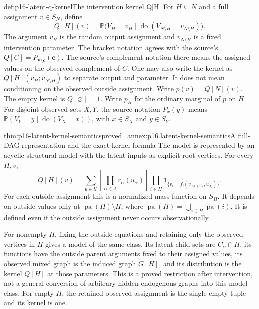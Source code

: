\begin{hbdefinition}{def:p16-latent-q-kernel}{The intervention kernel Q[H]}
For \(H\subseteq N\) and a full assignment \(v\in S_N\), define
\[
 Q[H](v)=
 \mathbb P\bigl(V_H=v_H\mid
       \operatorname{do}(V_{N\setminus H}=v_{N\setminus H})\bigr).
\]
The argument \(v_H\) is the random output assignment and
\(v_{N\setminus H}\) is a fixed intervention parameter. The bracket
notation agrees with the source's \(Q[C]=P_{\mathbf v\setminus\mathbf c}(\mathbf c)\).
The source's complement notation there means the assigned values on
the observed complement of \(C\). One may also write the kernel
as \(Q[H](v_H;v_{N\setminus H})\) to separate output and parameter.
It does not mean conditioning on the observed outside assignment.
Write \(p(v)=Q[N](v)\). The empty kernel is \(Q[\varnothing]=1\).
Write \(p_H\) for the ordinary marginal of \(p\) on \(H\).
For disjoint observed sets \(X,Y\), the source notation \(P_x(y)\)
means \(\mathbb P(V_Y=y\mid\operatorname{do}(V_X=x))\), with
\(x\in S_X\) and \(y\in S_Y\).
\end{hbdefinition}

\begin{hbtheorem}{thm:p16-latent-kernel-semantics}{proved=annex:p16.latent-kernel-semantics}{A full-DAG representation and the exact kernel formula}
The model is represented by an acyclic structural model with the
latent inputs as explicit root vertices. For every \(H,v\),
\[
 Q[H](v)=\sum_{u\in\mathcal U}
       \left[\prod_{\alpha\in\Lambda}r_\alpha(u_\alpha)\right]
       \prod_{i\in H}
       \mathbf1_{\{v_i=f_i(v_{\operatorname{pa}(i)},u_{\Lambda_i})\}}.
\]
For each outside assignment this is a normalized mass function on
\(S_H\). It depends on outside values only at
\(\operatorname{pa}(H)\setminus H\), where
\(\operatorname{pa}(H)=\bigcup_{i\in H}\operatorname{pa}(i)\).
It is defined even if the outside assignment never occurs observationally.

For nonempty \(H\), fixing the outside equations and retaining only the observed
vertices in \(H\) gives a model of the same class. Its latent child
sets are \(C_\alpha\cap H\), its functions have the outside
parent arguments fixed to their assigned values, its observed mixed
graph is the induced graph \(G[H]\), and its distribution is
the kernel \(Q[H]\) at those parameters. This is a proved
restriction after intervention, not a general conversion of arbitrary
hidden endogenous graphs into this model class.
For empty \(H\), the retained observed assignment is the single
empty tuple and its kernel is one.
\end{hbtheorem}

